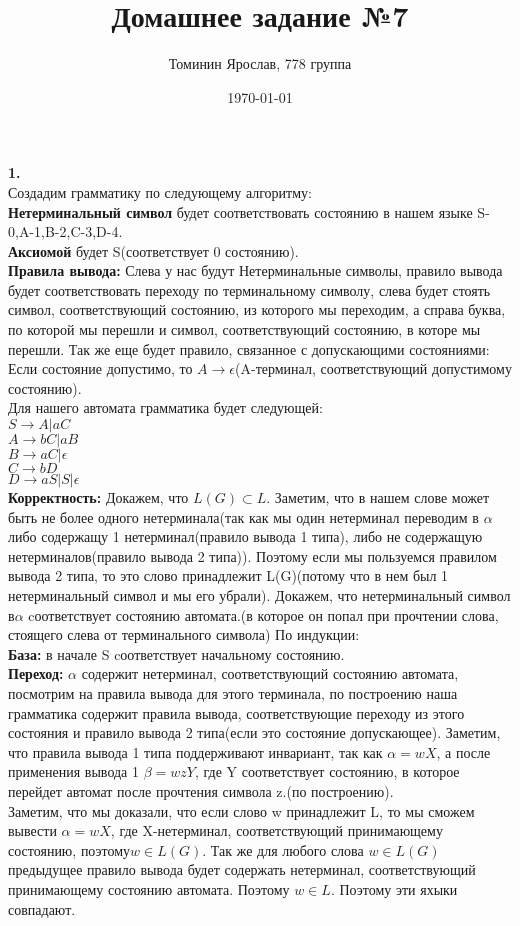 \documentclass[a4paper,12pt]{article}
\author{Томинин Ярослав, 778 группа}
\title{Домашнее задание №7}
\date{\today}
\begin{document}
 

\maketitle
\newpage
\textbf{1.}\\
Создадим грамматику по следующему алгоритму: \\ 
\textbf{Нетерминальный символ} будет соответствовать состоянию в нашем языке S-0,A-1,B-2,C-3,D-4.\\
\textbf{Аксиомой} будет S(соответствует 0 состоянию). \\
\textbf{Правила вывода:} Слева у нас будут Нетерминальные символы, правило вывода будет соответствовать переходу по терминальному символу, слева будет стоять символ, соответствующий состоянию, из которого мы переходим, а справа буква, по которой мы перешли и символ, соответствующий состоянию, в которе мы перешли. Так же еще будет правило, связанное с допускающими состояниями: Если состояние допустимо, то $A \rightarrow \epsilon$(A-терминал, соответствующий допустимому состоянию).\\
Для нашего автомата грамматика будет следующей:\\
$S\rightarrow A|aC$\\
$A\rightarrow bC|aB$\\
$B\rightarrow aC|\epsilon$\\
$C\rightarrow bD$\\
$D\rightarrow aS|S|\epsilon$\\
\textbf{Корректность:} Докажем, что $L(G) \subset L$. Заметим, что в нашем слове может быть не более одного нетерминала(так как мы один нетерминал переводим в $\alpha$ либо содержащу 1 нетерминал(правило вывода 1 типа), либо не содержащую нетерминалов(правило вывода 2 типа)). Поэтому если мы пользуемся правилом вывода 2 типа, то это слово принадлежит L(G)(потому что в нем был 1 нетерминальный символ и мы его убрали). Докажем, что нетерминальный символ в$ \alpha$ cоответствует состоянию автомата.(в которое он попал при прочтении слова, стоящего слева от терминального символа) По индукции: \\
\textbf{База:} в начале S cоответствует начальному состоянию.\\
\textbf{Переход:} $\alpha$ содержит нетерминал, соответствующий состоянию автомата, посмотрим на правила вывода для этого терминала, по построению наша грамматика содержит правила вывода, соответствующие переходу из этого состояния и правило вывода 2 типа(если это состояние допускающее). Заметим, что правила вывода 1 типа поддерживают инвариант, так как $\alpha=w X$, а после применения вывода 1 $\beta = wz Y$, где Y соответствует состоянию, в которое перейдет автомат после прочтения символа z.(по построению).\\
Заметим, что мы доказали, что если слово w принадлежит L, то мы сможем вывести $\alpha=wX$, где X-нетерминал, соответствующий принимающему состоянию, поэтому$w \in  L(G)$. Так же для любого слова $w \in  L(G)$ предыдущее правило вывода будет содержать нетерминал, соответствующий принимающему состоянию автомата. Поэтому $w\in L$. Поэтому эти яхыки совпадают.\\
\end{document}
